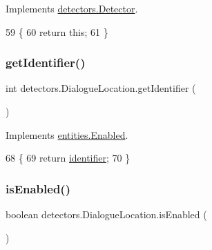Implements \mbox{\hyperlink{interfacedetectors_1_1_detector_a0b2ecb13c6db0ff6a02e57c193bcf8b2}{detectors.\+Detector}}.


\begin{DoxyCode}
59                            \{
60         \textcolor{keywordflow}{return} \textcolor{keyword}{this};
61     \}
\end{DoxyCode}
\mbox{\label{classdetectors_1_1_dialogue_location_a076072001b2bba735eec60606025f9b6}} 
\subsubsection{\texorpdfstring{get\+Identifier()}{getIdentifier()}}
{\footnotesize\ttfamily int detectors.\+Dialogue\+Location.\+get\+Identifier (\begin{DoxyParamCaption}{ }\end{DoxyParamCaption})\hspace{0.3cm}{\ttfamily [inline]}}



Implements \mbox{\hyperlink{interfaceentities_1_1_enabled_afbf595b80729c70944d508375ea7a5fd}{entities.\+Enabled}}.


\begin{DoxyCode}
68                                \{
69         \textcolor{keywordflow}{return} \mbox{\hyperlink{classdetectors_1_1_dialogue_location_a27a2a136c8c8b9df94946afcddf90e7d}{identifier}};
70     \}
\end{DoxyCode}
\mbox{\label{classdetectors_1_1_dialogue_location_a7813c3b2d0b00ae7c832fef3a2b12dfc}} 
\subsubsection{\texorpdfstring{is\+Enabled()}{isEnabled()}}
{\footnotesize\ttfamily boolean detectors.\+Dialogue\+Location.\+is\+Enabled (\begin{DoxyParamCaption}{ }\end{DoxyParamCaption})\hspace{0.3cm}{\ttfamily [inline]}}



